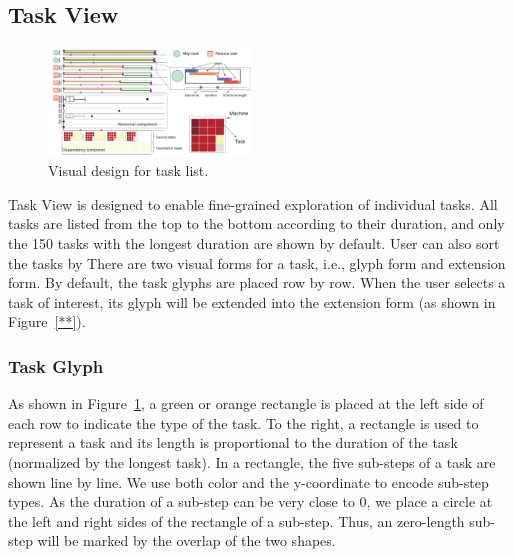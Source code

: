 \subsection{Task View}


\begin{figure}[t]
	\centering
	\includegraphics[width=0.48\textwidth]{figures/visualization/taskList.pdf}
	\vspace{-3mm}
	\caption{Visual design for task list.}
	\label{fig:taskList}
	\vspace{-3mm}
\end{figure}


Task View is designed to enable fine-grained exploration of individual tasks.
All tasks are listed from the top to the bottom according to their duration, and only the 150 tasks with the longest duration are shown by default. User can also sort the tasks by There are two visual forms for a task, i.e., glyph form and extension form. By default, the task glyphs are placed row by row. When the user selects a task of interest, its glyph will be extended into the extension form (as shown in Figure~\ref{**}).


\subsubsection{Task Glyph}
As shown in Figure~\ref{fig:taskList}, a green or orange rectangle is placed at the left side of each row to indicate the type of the task. To the right, a rectangle is used to represent a task and its length is proportional to the duration of the task (normalized by the longest task). In a rectangle, the five sub-steps of a task are shown line by line. We use both color and the y-coordinate to encode sub-step types. As the duration of a sub-step can be very close to 0, we place a circle at the left and right sides of the rectangle of a sub-step. Thus, an zero-length sub-step will be marked by the overlap of the two shapes.

